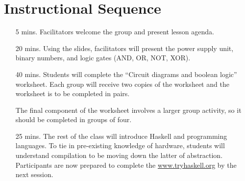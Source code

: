 \documentclass[11pt]{article}
\begin{document}
\section*{Instructional Sequence}

\begin{itemize}
  \item[5 mins.]
    Facilitators welcome the group and present lesson agenda.

  \item[20 mins.]
    Using the slides, facilitators will present the power supply unit, binary
    numbers, and logic gates (AND, OR, NOT, XOR).

  \item[40 mins.]
    Students will complete the ``Circuit diagrams and boolean logic''
    worksheet.
    Each group will receive two copies of the worksheet and the worksheet is to
    be completed in pairs.

    The final component of the worksheet involves a larger group activity, so
    it should be completed in groups of four.

  \item[25 mins.]
    The rest of the class will introduce Haskell and programming languages. To
    tie in pre-existing knowledge of hardware, students will understand
    compilation to be moving down the latter of abstraction. Participants are
    now prepared to complete the \url{www.tryhaskell.org} by the next session.
\end{itemize}
\end{document}
